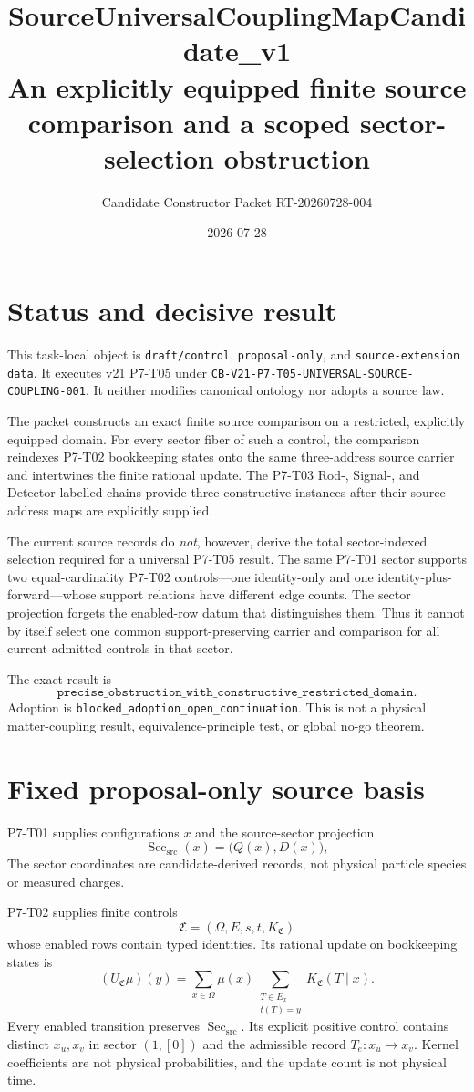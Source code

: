 \documentclass[11pt]{article}
\title{SourceUniversalCouplingMapCandidate\_v1\\
\large An explicitly equipped finite source comparison and a scoped
sector-selection obstruction}
\author{Candidate Constructor Packet RT-20260728-004}
\date{2026-07-28}
\newcommand{\Sec}{\operatorname{Sec}_{\mathrm{src}}}
\newcommand{\Control}{\mathfrak C}
\newcommand{\Update}{U}
\begin{document}
\maketitle

\section{Status and decisive result}

This task-local object is \texttt{draft/control}, \texttt{proposal-only},
and \texttt{source-extension data}.  It executes v21 P7-T05 under
\texttt{CB-V21-P7-T05-UNIVERSAL-SOURCE-COUPLING-001}.  It neither modifies
canonical ontology nor adopts a source law.

The packet constructs an exact finite source comparison on a restricted,
explicitly equipped domain.  For every sector fiber of such a control, the
comparison reindexes P7-T02 bookkeeping states onto the same three-address
source carrier and intertwines the finite rational update.  The P7-T03
Rod-, Signal-, and Detector-labelled chains provide three constructive
instances after their source-address maps are explicitly supplied.

The current source records do \emph{not}, however, derive the total
sector-indexed selection required for a universal P7-T05 result.  The same
P7-T01 sector supports two equal-cardinality P7-T02 controls---one
identity-only and one identity-plus-forward---whose support relations have
different edge counts.  The sector projection forgets the enabled-row datum
that distinguishes them.  Thus it cannot by itself select one common
support-preserving carrier and comparison for all current admitted controls
in that sector.

The exact result is
\[
 \texttt{precise\_obstruction\_with\_constructive\_restricted\_domain}.
\]
Adoption is
\texttt{blocked\_adoption\_open\_continuation}.  This is not a physical
matter-coupling result, equivalence-principle test, or global no-go theorem.

\section{Fixed proposal-only source basis}

P7-T01 supplies configurations \(x\) and the source-sector projection
\[
 \Sec(x)=\bigl(Q(x),D(x)\bigr),
\]
The sector coordinates are candidate-derived records, not physical particle
species or measured charges.

P7-T02 supplies finite controls
\[
 \Control=(\Omega,E,s,t,K_{\Control})
\]
whose enabled rows contain typed identities.  Its rational update on
bookkeeping states is
\begin{equation}
  (\Update_{\Control}\mu)(y)
  =
  \sum_{x\in\Omega}\mu(x)
  \sum_{\substack{T\in E_x\\t(T)=y}}
  K_{\Control}(T\mid x).
  \label{eq:p7t02-update}
\end{equation}
Every enabled transition preserves \(\Sec\).  Its explicit positive control
contains distinct \(x_u,x_v\) in sector \((1,[0])\) and the admissible record
\(T_e:x_u\to x_v\).  Kernel coefficients are not physical probabilities,
and the update count is not physical time.
\end{document}
